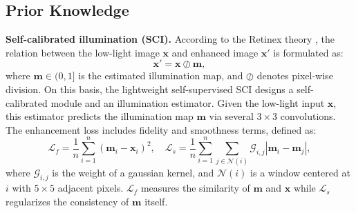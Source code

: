 \documentclass{article}
\begin{document}
\subsection{Prior Knowledge}\label{sec_prior}
\textbf{Self-calibrated illumination (SCI).} According to the Retinex theory \cite{land1977retinex}, the relation between the low-light image $\boldsymbol x$ and enhanced image $\boldsymbol x'$ is formulated as: 
\begin{equation}\label{eq_retinex}
\boldsymbol x'=\boldsymbol x \oslash \boldsymbol m,
\end{equation}
where $\boldsymbol m\in (0, 1]$ is the estimated illumination map, and $\oslash$ denotes pixel-wise division. On this basis, the lightweight self-supervised SCI \cite{ma2022toward} designs %
a self-calibrated module and an illumination estimator. Given the low-light input $\boldsymbol x$, this estimator predicts the illumination map $\boldsymbol m$ via several $3\times 3$ convolutions. The enhancement loss includes fidelity and smoothness terms, defined as: 
\begin{equation}\label{eq_lf_ls}
{\mathcal{L}_{f}}=\frac{1}{n}\sum_{i=1}^{n}{{\left( \boldsymbol m_i-\boldsymbol x_i \right)}^{2}}, \quad {\mathcal{L}_{s}}=\frac{1}{n}\sum\limits_{i=1}^{n}{\sum\limits_{j\in \mathcal{N}\left( i \right)}{{{\mathcal{G}}_{i,j}}\left| {{\boldsymbol m}_{i}}-{{\boldsymbol m}_{j}} \right|}}, 
\end{equation}
where $\mathcal{G}_{i,j}$ is the weight of a gaussian kernel, and $\mathcal{N}\left( i \right)$ is a window centered at $i$ with $5\times 5$ adjacent pixels. $\mathcal{L}_{f}$ measures the similarity of $\boldsymbol m$ and $\boldsymbol x$ while $\mathcal{L}_{s}$ regularizes the consistency of $\boldsymbol m$ itself. 
\end{document}
